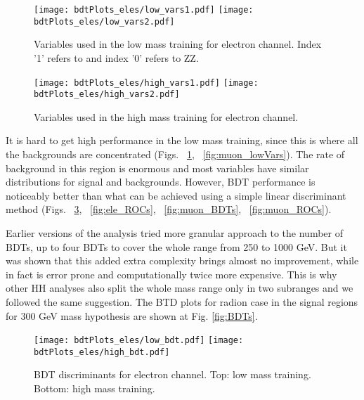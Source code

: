 \begin{figure}[tbp]
  \begin{center}
   \texttt{[image: bdtPlots\_eles/low\_vars1.pdf]}
   \texttt{[image: bdtPlots\_eles/low\_vars2.pdf]}
    \caption{ Variables used in the low mass training for electron channel. Index '1' refers to \bbbar and index '0' refers to ZZ.}
    \label{fig:ele_lowVars}
  \end{center}
\end{figure}



\begin{figure}[tbp]
  \begin{center}
   \texttt{[image: bdtPlots\_eles/high\_vars1.pdf]}
   \texttt{[image: bdtPlots\_eles/high\_vars2.pdf]}
    \caption{ Variables used in the high mass training for electron channel.}
    \label{fig:ele_highVars}
  \end{center}
\end{figure}


It is hard to get high performance in the low mass training, since
this is where all the backgrounds are concentrated (Figs. ~\ref{fig:ele_lowVars}, ~\ref{fig:muon_lowVars}). The rate of background in this region is enormous and most variables have similar distributions for signal and backgrounds. However, BDT performance is noticeably better than what can be achieved using a simple linear discriminant method (Figs. ~\ref{fig:ele_BDTs}, ~\ref{fig:ele_ROCs}, ~\ref{fig:muon_BDTs}, ~\ref{fig:muon_ROCs}). 

Earlier versions of the analysis tried more granular approach to the number of BDTs, up to four BDTs to cover the whole range from 250 to 1000 GeV. But it was shown that this added extra complexity brings almost no improvement, while in fact is error prone and computationally twice more expensive. This is why other HH analyses also split the whole mass range only in two subranges and we followed the same suggestion. The BTD plots for radion case in the signal regions for 300 GeV mass hypothesis are shown at Fig. \ref{fig:BDTs}.



\begin{figure}[tbp]
  \begin{center}
   \texttt{[image: bdtPlots\_eles/low\_bdt.pdf]}
   \texttt{[image: bdtPlots\_eles/high\_bdt.pdf]}
    \caption{ BDT discriminants for electron channel. Top: low mass training. Bottom: high mass training. }
    \label{fig:ele_BDTs}
  \end{center}
\end{figure}

